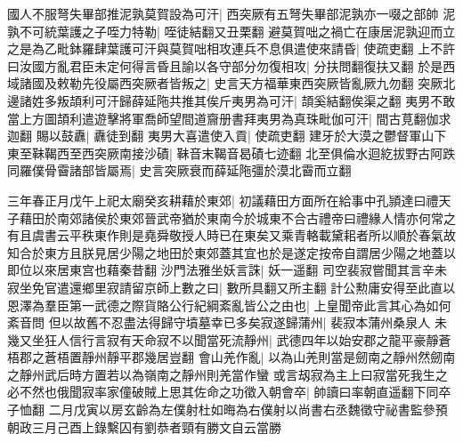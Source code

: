 國人不服弩失畢部推泥孰莫賀設為可汗|{
	西突厥有五弩失畢部泥孰亦一啜之部帥}
泥孰不可統葉護之子咥力特勒|{
	咥徒結翻又丑栗翻}
避莫賀咄之禍亡在康居泥孰迎而立之是為乙毗鉢羅肆葉護可汗與莫賀咄相攻連兵不息俱遣使來請昏|{
	使疏吏翻}
上不許曰汝國方亂君臣未定何得言昏且諭以各守部分勿復相攻|{
	分扶問翻復扶又翻}
於是西域諸國及敕勒先役屬西突厥者皆叛之|{
	史言天方福華東西突厥皆亂厥九勿翻}
突厥北邊諸姓多叛頡利可汗歸薛延陁共推其俟斤夷男為可汗|{
	頡奚結翻俟渠之翻}
夷男不敢當上方圖頡利遣遊擊將軍喬師望間道齎册書拜夷男為真珠毗伽可汗|{
	間古莧翻伽求迦翻}
賜以鼓纛|{
	纛徒到翻}
夷男大喜遣使入貢|{
	使疏吏翻}
建牙於大漠之鬱督軍山下東至靺鞨西至西突厥南接沙磧|{
	靺音末鞨音曷磧七迹翻}
北至俱倫水迴紇拔野古阿跌同羅僕骨霫諸部皆屬焉|{
	史言突厥衰而薛延陁彊於漠北霫而立翻}


三年春正月戊午上祀太廟癸亥耕藉於東郊|{
	初議藉田方面所在給事中孔頴達曰禮天子藉田於南郊諸侯於東郊晉武帝猶於東南今於城東不合古禮帝曰禮緣人情亦何常之有且虞書云平秩東作則是堯舜敬授人時已在東矣又乘青輅載黛耜者所以順於春氣故知合於東方且朕見居少陽之地田於東郊蓋其宜也於是遂定按帝自謂居少陽之地蓋以即位以來居東宫也藉秦昔翻}
沙門法雅坐妖言誅|{
	妖一遥翻}
司空裴寂嘗聞其言辛未寂坐免官遣還鄉里寂請留京師上數之曰|{
	數所具翻又所主翻}
計公勲庸安得至此直以恩澤為羣臣第一武德之際貨賂公行紀綱紊亂皆公之由也|{
	上皇聞帝此言其心為如何紊音問}
但以故舊不忍盡法得歸守墳墓幸已多矣寂遂歸蒲州|{
	裴寂本蒲州桑泉人}
未幾又坐狂人信行言寂有天命寂不以聞當死流靜州|{
	武德四年以始安郡之龍平豪靜蒼梧郡之蒼梧置靜州靜平郡幾居豈翻}
會山羌作亂|{
	以為山羌則當是劒南之靜州然劒南之靜州武后時方置若以為嶺南之靜州則羌當作蠻}
或言刼寂為主上曰寂當死我生之必不然也俄聞寂率家僮破賊上思其佐命之功徵入朝會卒|{
	帥讀曰率朝直遥翻下同卒子恤翻}
二月戊寅以房玄齡為左僕射杜如晦為右僕射以尚書右丞魏徵守祕書監參預朝政三月己酉上錄繫囚有劉恭者頸有勝文自云當勝

